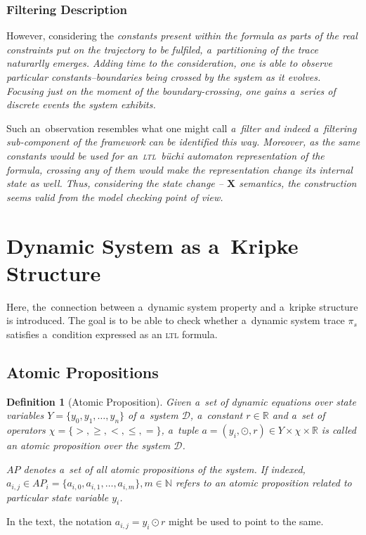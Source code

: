 \documentclass[12pt,oneside,draft]{fithesis}
\newcommand{\ltl}{\textsc{ltl}~}
\newcommand{\mD}{\mathcal{D}}
\newcommand{\mReal}{\mathbb{R}}
\newcommand{\mNatural}{\mathbb{N}}
\newcommand{\bX}{\mathbf{X}}
\newtheorem{mydef}{Definition}
\begin{document}
\subsubsection*{Filtering Description}
However, considering the \em constants \rm present within the formula as
parts of the real \em constraints \rm put on the trajectory to be
fulfiled, a~partitioning of the trace naturarlly emerges. Adding time
to the consideration, one is able to observe particular
constants--boundaries being crossed by the system as it evolves.
\em Focusing just on the moment of the boundary-crossing, one
gains a~series of discrete events the system exhibits\rm{}.

Such an~observation resembles what one might call \em a~filter \rm
and indeed a~filtering sub-component of the framework can be identified
this way. Moreover, as the same constants would be used for
an~\ltl b\"{u}chi automaton representation of the formula, crossing any
of them would make the representation change its internal state as well.
Thus, considering the state change -- $\bX$ semantics, the construction
seems valid from the model checking point of view.

\section{Dynamic System as a~Kripke Structure}
Here, the~connection between a~dynamic system property
and a~kripke structure is introduced. The goal is to be able to check
whether a~dynamic system trace $\pi_s$ satisfies a~condition expressed
as an \textsc{ltl} formula.

\subsection{Atomic Propositions}
\begin{mydef}[Atomic Proposition]
Given a~set of dynamic equations over state variables
$Y=\{y_0,y_1,\dotsc,y_n\}$ of a~system $\mD$, a~constant $r\in\mReal$
and a~set of operators $\chi=\{>,\geq,<,\leq,=\}$, a~tuple
$a=(y_i,\odot,r)\in Y\times\chi\times\mReal$ is called an atomic
proposition over the system $\mD$.

$AP$ denotes a~set of all atomic propositions of the system.
If indexed,
$a_{i,j}\in AP_i=\{a_{i,0},a_{i,1},\dotsc,a_{i,m}\},m\in\mNatural$
refers to an atomic proposition related to particular state variable
$y_i$.
\end{mydef}
In the text, the notation $a_{i,j}=y_i\odot r$ might be used to point
to the same.
\end{document}
